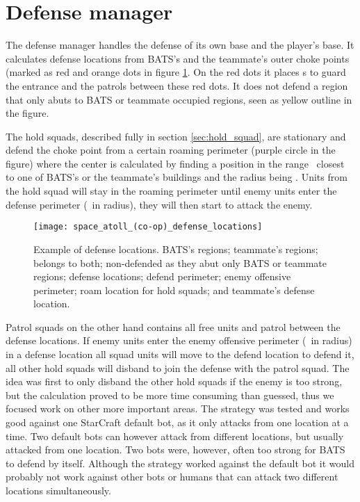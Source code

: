 \section{Defense manager}
\label{sec:defense_manager}
The defense manager handles the defense of its own base and the player’s base. It calculates defense locations from BATS's and the teammate's outer choke points (marked as red and orange dots in figure \ref{fig:defense_locations}. On the red dots it places s to guard the entrance and the  patrols between these red dots. It does not defend a region that only abuts to BATS or teammate occupied regions, seen as yellow outline in the figure.

The hold squads, described fully in section \ref{sec:hold_squad}, are stationary and defend the choke point from a certain roaming perimeter (purple circle in the figure) where the center is calculated by finding a position in the range \squadDefendRoamDistanceMinMax~closest to one of BATS’s or the teammate’s buildings and the radius being \squadDefendRoamPerimeter. Units from the hold squad will stay in the roaming perimeter until enemy units enter the defense perimeter (\squadDefendDefendPerimeter~in radius), they will then start to attack the enemy. 

\begin{figure}[htb]
\centering
\texttt{[image: space\_atoll\_(co-op)\_defense\_locations]}
\caption[Defense locations example]{
	Example of defense locations.
	\usebox{\LegendLineLightGreen} BATS’s regions;
	\usebox{\LegendLineLightBlue} teammate’s regions;
	\usebox{\LegendLineLightGreenLightBlue} belongs to both;
	\usebox{\LegendLineYellow} non-defended as they abut only BATS or teammate regions;
	\usebox{\LegendDotRed} defense locations;
	\usebox{\LegendCircleRed} defend perimeter;
	\usebox{\LegendCircleBrown} enemy offensive perimeter;
	\usebox{\LegendCircleViolet} roam location for hold squads; and
	\usebox{\LegendDotOrange} teammate's defense location.}
\label{fig:defense_locations}
\end{figure}

Patrol squads on the other hand contains all free units and patrol between the defense locations. If enemy units enter the enemy offensive perimeter (\squadDefendEnemyOffensivePerimeter~in radius) in a defense location all squad units will move to the defend location to defend it, all other hold squads will disband to join the defense with the patrol squad. The idea was first to only disband the other hold squads if the enemy is too strong, but the calculation proved to be more time consuming than guessed, thus we focused work on other more important areas. The strategy was tested and works good against one StarCraft default bot, as it only attacks from one location at a time. Two default bots can however attack from different locations, but usually attacked from one location. Two bots were, however, often too strong for BATS to defend by itself. Although the strategy worked against the default bot it would probably not work against other bots or humans that can attack two different locations simultaneously.

